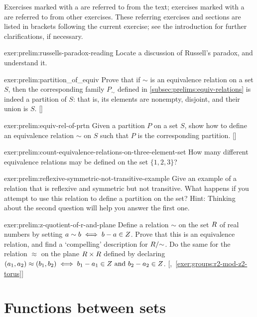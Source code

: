 Exercises marked with a \exerused{} are referred to from the text;
exercises marked with a \lnot{} are referred to from other
exercises. These referring exercises and sections are listed in
brackets following the current exercise; see the introduction for
further clarifications, if necessary.
\begin{exer}{}{exer:prelim:russells-paradox-reading}
  Locate a discussion of Russell's paradox, and understand it.
\end{exer}
\begin{exer}{}{exer:prelim:partition_of_equiv} Prove that if $\sim$ is
  an equivalence relation on a set $S$, then the corresponding family
  $P_\sim$ defined in \cref{subsec:prelims:equiv-relations} is indeed
  a partition of $S$: that is, its elements are nonempty, disjoint,
  and their union is $S$. []
\end{exer}
\begin{exer}{}{exer:prelim:equiv-rel-of-prtn}
  \exerused{} Given a partition $P$ on a set $S$, show how to define
  an equivalence relation $\sim$ on $S$ such that $P$ is the
  corresponding partition. []
\end{exer}
\begin{exer}{}{exer:prelim:count-equivalence-relations-on-three-element-set}
  How many different equivalence relations may be defined on the set
  $\{1, 2, 3\}$?
\end{exer}
\begin{exer}{}{exer:prelim:reflexive-symmetric-not-transitive-example}
  Give an example of a relation that is reflexive and symmetric but
  not transitive.  What happens if you attempt to use this relation to
  define a partition on the set?  Hint: Thinking about the second
  question will help you answer the first one.
\end{exer}
\begin{exer}{}{exer:prelim:z-quotient-of-r-and-plane}
  Define a relation $\sim$ on the set $R$ of real numbers by setting
  $a \sim b \iff b-a \in Z$. Prove that this is an equivalence
  relation, and find a `compelling' description for
  $R/{\sim}$. Do the same for the relation $\approx$ on the
  plane $R \times R$ defined by declaring
  $(a_1, a_2) \approx (b_1 , b_2) \iff b_1 - a_1 \in Z \text{ and }
  b_2 - a_2 \in Z$.
  [,~\ref{exer:groups:r2-mod-z2-torus}]
\end{exer}

\section{Functions between sets}%
\label{sec:prelims:functions-between-sets}

